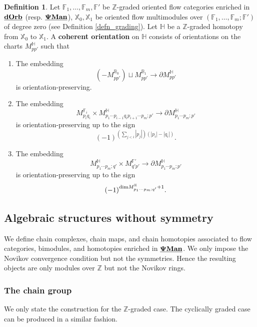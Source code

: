 \documentclass[reqno, 10pt]{amsart}
\numberwithin{equation}{section}
\numberwithin{equation}{section}
\theoremstyle{definition}
\newtheorem{defn}[thm]{Definition}
\theoremstyle{remark}
\newcommand{\beqn}{\begin{equation*}}
\newcommand{\eeqn}{\end{equation*}}
\newcommand{\mb}{\mathbb}
\newcommand{\pman}{\uds{{\bf \Psi}{\bf Man}}}
\newcommand{\uds}[1]{\underline{\smash{#1}}}
\begin{document}
\begin{defn}\label{defn_orientation_homotopy}
Let ${\mb F}_1, \ldots, {\mb F}_m, {\mb F}'$ be ${\mb Z}$-graded oriented flow categories enriched in $\uds{\bf dOrb}$ (resp. $\pman$), ${\mb X}_0, {\mb X}_1$ be oriented flow multimodules over $( {\mb F}_1, \ldots, {\mb F}_m; {\mb F}')$ of degree zero (see Definition \ref{defn_grading}). Let ${\mb H}$ be a ${\mb Z}$-graded homotopy from $ {\mb X}_0$ to $ {\mb X}_1$. A {\bf coherent orientation} on ${\mb H}$ consists of orientations on the charts $M_{pp'}^{{\mb H}}$ such that 
\begin{enumerate}

\item The embedding 
\beqn
(- M_{pp'}^{{\mb B}_0}) \sqcup M_{pp'}^{{\mb B}_1} \to \partial M_{pp'}^{{\mb H}}
\eeqn
is orientation-preserving.

\item The embedding
\beqn
M_{p_i q_i}^{{\mb F}_i} \times M_{p_1 \cdots p_{i-1} q_i p_{i+1} \cdots p_m; p'}^{{\mb H}} \to \partial M_{p_1 \cdots p_m; p'}^{{\mb H}}
\eeqn
is orientation-preserving up to the sign 
\beqn
(-1)^{ \left( \sum_{j<i} |p_j| \right) (|p_i|-|q_i|)}.
\eeqn

\item The embedding
\beqn
M_{p_1 \cdots p_m; q'}^{{\mb H}} \times M_{q'p'}^{{\mb F}'} \to \partial M_{p_1 \cdots p_m; p'}^{{\mb H}}
\eeqn
is orientation-preserving up to the sign
\beqn
(-1)^{{\rm dim} M_{p_1 \cdots p_m; q'}^{\mb H} + 1}.
\eeqn
\end{enumerate}
\end{defn}


\subsection{Algebraic structures without symmetry}\label{subsection_abstract_chain_complex}

We define chain complexes, chain maps, and chain homotopies associated to flow categories, bimodules, and homotopies enriched in $\pman$. We only impose the Novikov convergence condition but not the symmetries. Hence the resulting objects are only modules over ${\mb Z}$ but not the Novikov rings.

\subsubsection{The chain group}

We only state the construction for the ${\mb Z}$-graded case. The cyclically graded case can be produced in a similar fashion. 
\end{document}
